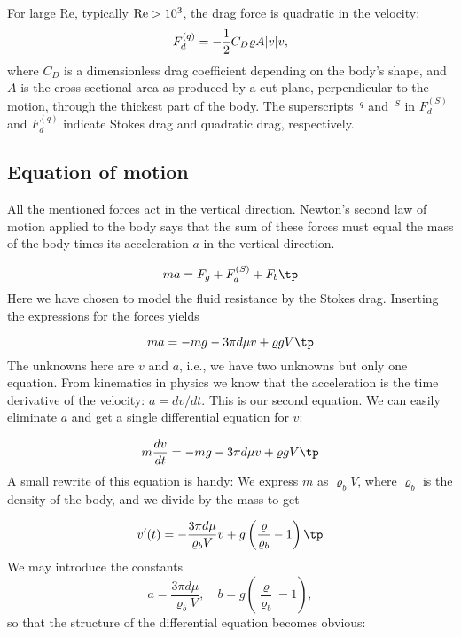 \documentclass[graybox,sectrefs,envcountresetchap,open=right,final]{svmonodo}
\begin{document}
For large Re, typically $\hbox{Re} > 10^3$, the drag force is quadratic
in the velocity:
\begin{equation}
F_d^{(q)} = -{1\over2}C_D\varrho A|v|v,
\end{equation}
where $C_D$ is a dimensionless drag coefficient depending on the body's shape,
and $A$ is the cross-sectional area as
produced by a cut plane, perpendicular to the motion, through the thickest
part of the body. The superscripts $\,{}^q$ and $\,{}^S$ in
$F_d^{(S)}$ and $F_d^{(q)}$ indicate Stokes drag and quadratic drag,
respectively.

\subsection{Equation of motion}

All the mentioned forces act in the vertical direction.
Newton's second law of motion applied to the body says that the sum of
these forces must equal the mass of the body times its acceleration
$a$ in the vertical direction.

\begin{equation*} ma = F_g + F_d^{(S)} + F_b \tp\end{equation*}
Here we have chosen to model the fluid resistance by the Stokes drag.
Inserting the expressions for the forces yields

\[  ma = -mg - 3\pi d\mu v + \varrho gV
\tp
\]
The unknowns here are $v$ and $a$, i.e., we have two unknowns but only
one equation. From kinematics in physics we know that
the acceleration is the time derivative of the velocity: $a = dv/dt$.
This is our second equation.
We can easily eliminate $a$ and get a single differential equation for $v$:

\[ m{dv\over dt} = -mg - 3\pi d\mu v + \varrho gV
\tp
\]
A small rewrite of this equation is handy: We express $m$ as $\varrho_bV$,
where $\varrho_b$ is the density of the body, and we divide by
the mass to get

\begin{equation}
v^{\prime}(t) = - \frac{3\pi d\mu}{\varrho_b V} v + g\left(\frac{\varrho}{\varrho_b} -1\right)
\label{decay:app:fallingbody:model:S}
\tp
\end{equation}
We may introduce the constants
\begin{equation}
a = \frac{3\pi d\mu}{\varrho_b V},\quad
b = g\left(\frac{\varrho}{\varrho_b} -1\right),
\end{equation}
so that the structure of the differential equation becomes obvious:
\end{document}
